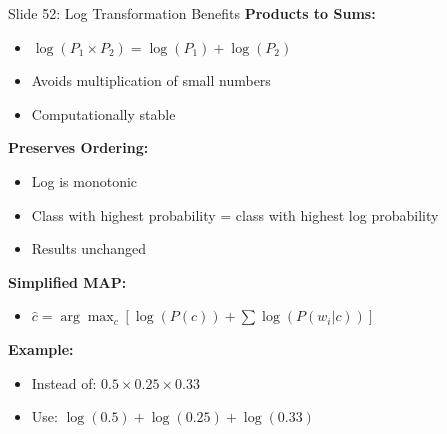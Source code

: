 \documentclass[8pt]{beamer}
\begin{document}
	\begin{frame}{Slide 52: Log Transformation Benefits}
		\fontsize{6.5}{7.5}\selectfont
		\textbf{Products to Sums:}
		\begin{itemize}
			\item $\log(P_1 \times P_2) = \log(P_1) + \log(P_2)$
			\item Avoids multiplication of small numbers
			\item Computationally stable
		\end{itemize}
		
		\vspace{0.1cm}
		\textbf{Preserves Ordering:}
		\begin{itemize}
			\item Log is monotonic
			\item Class with highest probability = class with highest log probability
			\item Results unchanged
		\end{itemize}
		
		\vspace{0.1cm}
		\textbf{Simplified MAP:}
		\begin{itemize}
			\item $\hat{c} = \arg\max_{c} [\log(P(c)) + \sum \log(P(w_i|c))]$
		\end{itemize}
		
		\textcolor{myblue}{\textbf{Example:}}
		\begin{itemize}
			\item Instead of: $0.5 \times 0.25 \times 0.33$
			\item Use: $\log(0.5) + \log(0.25) + \log(0.33)$
		\end{itemize}
	\end{frame}
	
\end{document}
